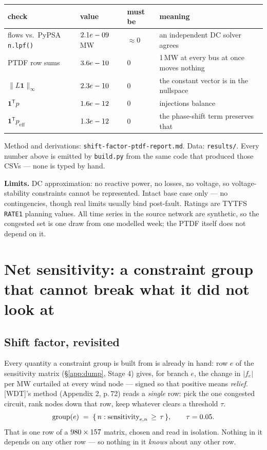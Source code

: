 \documentclass[11pt,a4paper]{article}
\newcommand{\T}{^{\mathsf{T}}}
\newcommand{\note}[1]{{\color{soft}\small #1}}
\begin{document}
\medskip
\begin{center}\small
\begin{tabular}{llll}
\toprule
\textbf{check} & \textbf{value} & \textbf{must be} & \textbf{meaning}\\
\midrule
flows vs.\ PyPSA \texttt{n.lpf()} & $2.1e-09$ MW & $\approx 0$ & an independent DC solver agrees\\
PTDF row sums & $3.6e-10$ & $0$ & 1\,MW at every bus at once moves nothing\\
$\|L\mathbf{1}\|_\infty$ & $2.3e-10$ & $0$ & the constant vector is in the nullspace\\
$\mathbf{1}\T p$ & $1.6e-12$ & $0$ & injections balance\\
$\mathbf{1}\T p_{\text{eff}}$ & $1.3e-12$ & $0$ & the phase-shift term preserves that\\
\bottomrule
\end{tabular}
\end{center}

\medskip
\note{Method and derivations: \texttt{shift-factor-ptdf-report.md}.
Data: \texttt{results/}. Every number above is emitted by \texttt{build.py}
from the same code that produced those CSVs --- none is typed by hand.}

\medskip
\note{\textbf{Limits.} DC approximation: no reactive power, no losses, no
voltage, so voltage-stability constraints cannot be represented. Intact base
case only --- no contingencies, though real limits usually bind post-fault.
Ratings are TYTFS \texttt{RATE1} planning values. All time series in the source
network are synthetic, so the congested set is one draw from one modelled week;
the PTDF itself does not depend on it.}

\newpage
\section{Net sensitivity: a constraint group that cannot break what it did not look at}

\subsection*{Shift factor, revisited}

Every quantity a constraint group is built from is already in hand: row $e$ of
the sensitivity matrix (\S\ref{app:dump}, Stage 4) gives, for branch $e$, the
change in $|f_e|$ per MW curtailed at every wind node --- signed so that
positive means \emph{relief}. [WDT]'s method (Appendix 2, p.\,72) reads a
\emph{single} row: pick the one congested circuit, rank nodes down that row,
keep whatever clears a threshold $\tau$.
\begin{equation}
  \text{group}(e) \;=\; \{\, n : \text{sensitivity}_{e,n} \,\ge\, \tau \,\},
  \qquad \tau = 0.05 .
\end{equation}
That is one row of a $980\times157$ matrix, chosen and read in isolation.
Nothing in it depends on any other row --- so nothing in it \emph{knows} about
any other row.
\end{document}
